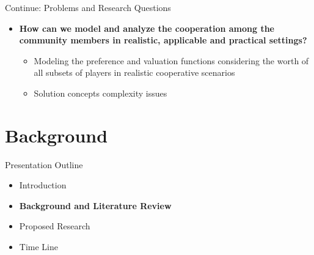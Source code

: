 \documentclass{beamer}
\begin{document}
\begin{frame}{Continue: Problems and Research Questions}
 \begin{itemize}
   \item \textbf{How can we model and analyze the cooperation
        among the community members in realistic, applicable and practical
        settings?}
        \begin{itemize}
            \item Modeling the preference and valuation functions considering the worth of all subsets of players in realistic cooperative scenarios
            \item Solution concepts complexity issues
        \end{itemize}

\end{itemize}
\end{frame}

\section{Background}
\begin{frame}{Presentation Outline}
    \begin{itemize}
     	\itemsep=.5cm
    	\item Introduction
    	\item {\bf Background and Literature Review}
    	\item Proposed Research
    	\item Time Line
    \end{itemize}
\end{frame}

\end{document}
